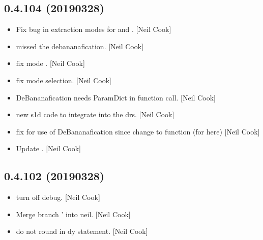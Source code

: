 \documentclass[a4paper,10pt,english]{report}
\begin{document}
\subsection{0.4.104 (2019\sphinxhyphen{}03\sphinxhyphen{}28)}
\label{\detokenize{misc/changelog:id175}}\begin{itemize}
\item {} 
Fix bug in extraction modes for  and
. {[}Neil Cook{]}

\item {} 
 \sphinxhyphen{} missed the debananafication. {[}Neil Cook{]}

\item {} 
 \sphinxhyphen{} fix mode . {[}Neil Cook{]}

\item {} 
 \sphinxhyphen{} fix mode selection. {[}Neil Cook{]}

\item {} 
 \sphinxhyphen{} DeBananafication needs ParamDict in function call.
{[}Neil Cook{]}

\item {} 
 \sphinxhyphen{} new s1d code to integrate into the drs.
{[}Neil Cook{]}

\item {} 
 \sphinxhyphen{} fix for use of DeBananafication since change to
function (for  here) {[}Neil Cook{]}

\item {} 
Update . {[}Neil Cook{]}

\end{itemize}


\subsection{0.4.102 (2019\sphinxhyphen{}03\sphinxhyphen{}28)}
\label{\detokenize{misc/changelog:id176}}\begin{itemize}
\item {} 
 \sphinxhyphen{} turn off  debug. {[}Neil Cook{]}

\item {} 
Merge branch ’ into neil. {[}Neil Cook{]}

\item {} 
 \sphinxhyphen{} do not round in dy statement. {[}Neil Cook{]}

\end{itemize}
\end{document}
